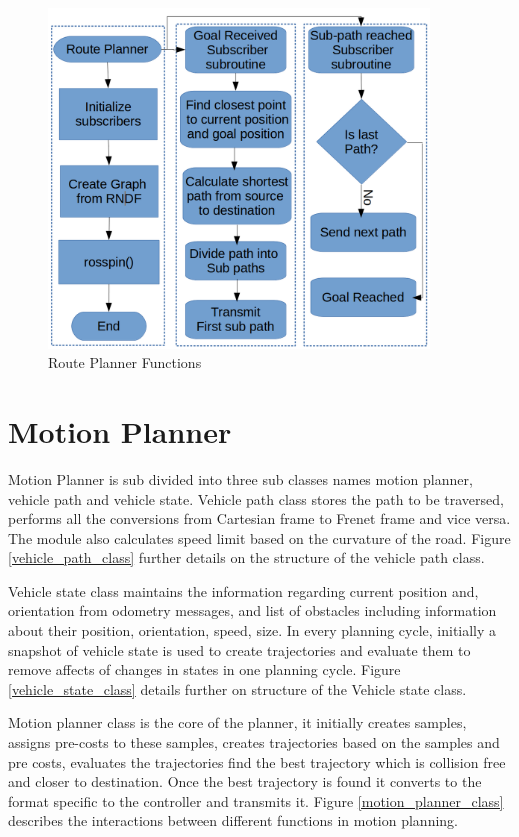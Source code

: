 \begin{figure}
	\centering
	\includegraphics[width=0.9\textwidth]{Images/implementation/route_planner.png}
	\caption{Route Planner Functions}
	\label{route_planner_func}
\end{figure}

\section{Motion Planner}
Motion Planner is sub divided into three sub classes names motion planner, vehicle path and vehicle state. Vehicle path class stores the path to be traversed, performs all the conversions from Cartesian frame to Frenet frame and vice versa. The module also calculates speed limit based on the curvature of the road. Figure \ref{vehicle_path_class} further details on the structure of the vehicle path class. 

Vehicle state class maintains the information regarding current position and, orientation from odometry messages, and list of obstacles including information about their position, orientation, speed, size. In every planning cycle, initially a snapshot of vehicle state is used to create trajectories and evaluate them to remove affects of changes in states in one planning cycle. Figure \ref{vehicle_state_class} details further on structure of the Vehicle state class. 


Motion planner class is the core of the planner, it initially creates samples, assigns pre-costs to these samples, creates trajectories based on the samples and pre costs, evaluates the trajectories find the best trajectory which is collision free and closer to destination. Once the best trajectory is found it converts to the format specific to the controller and transmits it. Figure \ref{motion_planner_class} describes the interactions between different functions in motion planning.


